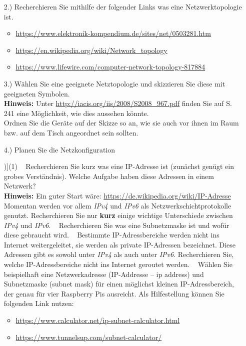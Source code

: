 \documentclass[paper=a4,fontsize=11pt]{scrartcl}%
\numberwithin{equation}{section}
\begin{document}
\begin{itemize}
	\item[2.)] Recherchieren Sie mithilfe der folgender Links was eine Netzwerktopologie ist.
	\begin{itemize}
		\item \url{https://www.elektronik-kompendium.de/sites/net/0503281.htm}
		\item \url{https://en.wikipedia.org/wiki/Network_topology}
		\item \url{https://www.lifewire.com/computer-network-topology-817884}
	\end{itemize}
	\item[3.)] Wählen Sie eine geeignete Netztopologie und skizzieren Sie diese mit geeigneten Symbolen.\\ \textbf{Hinweis:} Unter \url{http://iacis.org/iis/2008/S2008_967.pdf} finden Sie auf S. 241 eine Möglichkeit, wie dies aussehen könnte.\\
	Ordnen Sie die Geräte auf der Skizze so an, wie sie auch vor ihnen im Raum bzw. auf dem Tisch angeordnet sein sollten.
	\item[4.)] Planen Sie die Netzkonfiguration
\begin{tasks}[counter-format=(tsk[r])](1)	
	\task~ Recherchieren Sie kurz was eine IP-Adresse ist (zunächst genügt ein grobes Verständnis). Welche Aufgabe haben diese Adressen in einem Netzwerk?\\
	\textbf{Hinweis:} Ein guter Start wäre: \url{https://de.wikipedia.org/wiki/IP-Adresse}
	\task~ Momentan werden vor allem \emph{IPv4} und \emph{IPv6} als Netzwerkschichtprotokolle genutzt. Recherchieren Sie nur \textbf{kurz} einige wichtige Unterschiede zwischen \emph{IPv4} und \emph{IPv6}.
	\task~ Recherchieren Sie was eine Subnetzmaske ist und wofür diese gebraucht wird.
	\task~ Bestimmte IP-Adressbereiche werden nicht ins Internet weitergeleitet, sie werden als private IP-Adressen bezeichnet. Diese Adressen gibt es sowohl unter \emph{IPv4} als auch unter \emph{IPv6}. Recherchieren Sie, welche IP-Adressbereiche nicht ins Internet geroutet werden.
	\task~ Wählen Sie beispielhaft eine Netzwerkadresse (IP-Addresse -- ip address) und Subnetzmaske (subnet mask) für einen möglichst kleinen IP-Adressbereich, der genau für vier Raspberry Pis ausreicht. Als Hilfestellung können Sie folgenden Link nutzen:
	\begin{itemize}
		\item \url{https://www.calculator.net/ip-subnet-calculator.html}
		\item \url{https://www.tunnelsup.com/subnet-calculator/}
	\end{itemize}
\end{tasks} 
\end{itemize}
\end{document}
